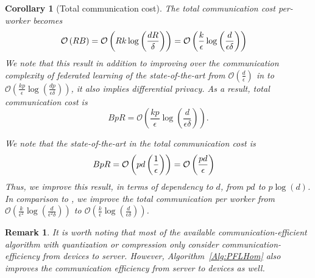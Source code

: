 \documentclass{article}
\newtheorem{corollary}{Corollary}
\newtheorem{remark}{Remark}
\begin{document}
\begin{corollary}[Total communication cost]
The total communication cost per-worker becomes 
\begin{align}\notag
\mathcal{O}\left(RB\right)&=\mathcal{O}\left(Rk\log \left(\frac{d R}{\delta}\right)\right)=\mathcal{O}\left(\frac{k }{\epsilon}\log \left(\frac{d }{\epsilon\delta}\right)\right)
\end{align}
We note that this result in addition to improving over the communication complexity of federated learning of the state-of-the-art from $\mathcal{O}\left(\frac{d}{\epsilon}\right)$ in \cite{karimireddy2019scaffold,liang2019variance,wang2018cooperative} to $\mathcal{O}\left(\frac{k p}{\epsilon}\log \left(\frac{d p}{\epsilon\delta}\right)\right)$, it also implies differential privacy. As a result, total communication cost is 
$$BpR=\mathcal{O}\left(\frac{k p}{\epsilon}\log \left(\frac{d }{\epsilon\delta}\right)\right).$$ 

We note that the state-of-the-art in \cite{karimireddy2019scaffold} the total communication cost is 
\begin{align}\notag
    BpR&=\mathcal{O}\left(pd\left(\frac{1}{\epsilon}\right) \right)=\mathcal{O}\left(\frac{pd}{\epsilon}\right) 
\end{align}
Thus, we improve this result, in terms of dependency to $d$, from $pd$ to $p\log(d)$.
In comparison to \cite{ivkin2019communication}, we improve the total communication per worker from $\mathcal{O}\left(\frac{k }{\epsilon^2}\log \left(\frac{d }{\epsilon^2\delta}\right)\right)$ to $\mathcal{O}\left(\frac{k }{\epsilon}\log \left(\frac{d }{\epsilon\delta}\right)\right)$.
\end{corollary}

\begin{remark}
It is worth noting that most of the available communication-efficient algorithm with quantization or compression only consider communication-efficiency from devices to server. However, Algorithm~\ref{Alg:PFLHom} also improves the communication efficiency from server to devices as well. 
\end{remark}
\end{document}
